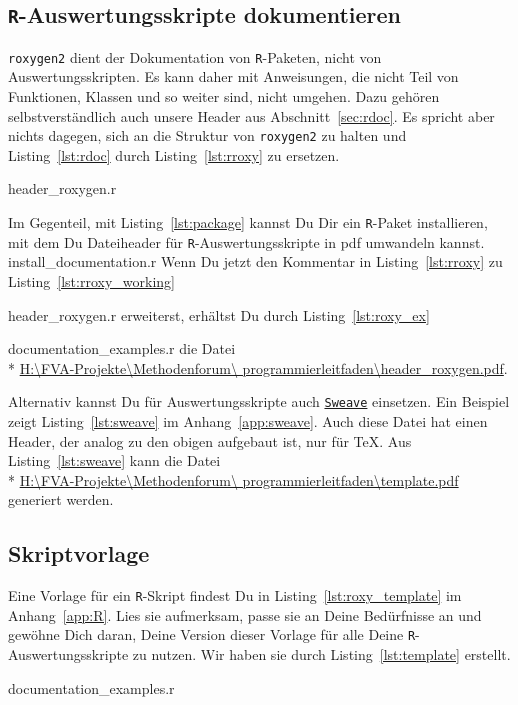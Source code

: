 \documentclass[twoside]{scrreprt}
\providecommand{\R}{\texttt{R}}
\providecommand{\code}[1]{\texttt{#1}}
\providecommand{\proot}{%
H:\textbackslash{}FVA-Projekte\textbackslash{}Methodenforum\textbackslash{}%
}
\providecommand{\pdir}{\proot{}programmierleitfaden\textbackslash{}}
\begin{document}
\subsection{\R{}-Auswertungsskripte dokumentieren
\label{sec:documentation}}
\code{roxygen2} dient der Dokumentation von \R{}-Paketen, nicht von
Auswertungsskripten. Es kann daher mit Anweisungen, die nicht Teil von
Funktionen, Klassen und so weiter sind, nicht umgehen. Dazu geh\"oren
selbstverst\"a{}ndlich auch unsere Header aus Abschnitt~\ref{sec:rdoc}.
Es spricht aber nichts dagegen, sich an die Struktur von \code{roxygen2} zu
halten und Listing~\ref{lst:rdoc} durch Listing~\ref{lst:rroxy} zu ersetzen.

{header_roxygen.r}

Im Gegenteil, mit Listing~\ref{lst:package} kannst Du Dir ein \R{}-Paket
installieren, mit dem Du 
Dateiheader 
f\"u{}r \R{}-Auswertungsskripte in pdf 
umwandeln
kannst.
{install_documentation.r}
 Wenn Du jetzt den Kommentar in  Listing~\ref{lst:rroxy} zu
Listing~\ref{lst:rroxy_working} 

{header_roxygen.r}
erweiterst, erh\"altst Du durch
Listing~\ref{lst:roxy_ex} 

{documentation_examples.r} die Datei \\*
\href{%
header_roxygen.pdf}{%
\pdir{}header\_roxygen.pdf}.  

 Alternativ kannst Du f\"u{}r 
Auswertungsskripte auch
\href{http://www.stat.uni-muenchen.de/~leisch/Sweave/}{\code{Sweave}} einsetzen.
Ein Beispiel zeigt Listing~\ref{lst:sweave} im
Anhang~\ref{app:sweave}.
Auch diese Datei hat einen Header, der analog zu den obigen aufgebaut ist, nur
f\"u{}r \TeX{}.
Aus  Listing~\ref{lst:sweave} kann die Datei \\* 
\href{%
template.pdf}{%
\pdir{}template.pdf}  
generiert werden.

\subsection{Skriptvorlage
 }
Eine Vorlage f\"ur ein \R{}-Skript findest Du in Listing~\ref{lst:roxy_template}
im Anhang~\ref{app:R}. 
Lies sie aufmerksam, passe sie an Deine Bed\"u{}rfnisse an und gew\"o{}hne Dich
daran, Deine Version dieser Vorlage f\"u{}r alle Deine \R{}-Auswertungsskripte
zu nutzen.
Wir haben sie durch Listing~\ref{lst:template} erstellt.

{documentation_examples.r}
\end{document}
